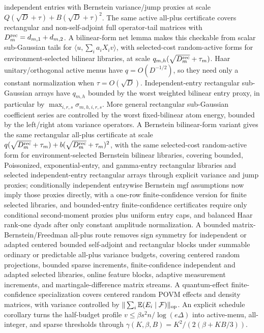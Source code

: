 \documentclass[11pt]{article}
\begin{document}
independent entries with Bernstein variance/jump proxies at scale
\(Q(\sqrt D+\tau)+B(\sqrt D+\tau)^2\).  The same active all-plus
certificate covers rectangular and non-self-adjoint full operator-tail matrices
with \(D_m^{\rm rec}=d_{m,1}+d_{m,2}\).  A bilinear-form net lemma makes this
checkable from scalar sub-Gaussian tails for
\(\langle u,\sum_i a_iX_i v\rangle\), with selected-cost random-active forms
for environment-selected bilinear libraries, at scale
\(q_{m,h}(\sqrt{D_m^{\rm rec}}+\tau_m)\).  Haar unitary/orthogonal active menus
have \(q=O(D^{-1/2})\), so they need only a constant normalization when
\(\tau=O(\sqrt D)\).  Independent-entry rectangular
sub-Gaussian arrays have \(q_{m,h}\) bounded by the worst weighted bilinear
entry proxy, in particular by \(\max_{i,r,s}\sigma_{m,h,i,r,s}\).  More general
rectangular sub-Gaussian coefficient series are controlled by the worst
fixed-bilinear atom energy, bounded by the left/right atom variance operators.
A Bernstein bilinear-form variant gives the same rectangular all-plus
certificate at scale
\(q(\sqrt{D_m^{\rm rec}}+\tau_m)+b(\sqrt{D_m^{\rm rec}}+\tau_m)^2\), with the
same selected-cost random-active form for environment-selected Bernstein
bilinear libraries, covering bounded, Poissonized, exponential-entry, and
gamma-entry rectangular libraries and selected independent-entry rectangular
arrays through explicit variance and jump proxies; conditionally independent
entrywise Bernstein mgf assumptions now imply those proxies directly, with a
one-row finite-confidence version for finite selected libraries,
and bounded-entry finite-confidence certificates require only conditional
second-moment proxies plus uniform entry caps,
and balanced Haar rank-one dyads after only constant amplitude normalization.
A bounded matrix-Bernstein/Freedman all-plus route removes sign symmetry for
independent or adapted centered bounded self-adjoint and rectangular blocks
under summable ordinary or predictable all-plus variance budgets, covering
centered random projections, bounded sparse increments, finite-confidence
independent and adapted selected libraries, online feature blocks,
adaptive measurement increments, and martingale-difference matrix streams.
A quantum-effect finite-confidence specialization covers centered random POVM
effects and density matrices, with variance controlled by
\(\|\sum_i\mathbb E(E_i\mid\mathcal F)\|_{\rm op}\).
An explicit schedule corollary turns the half-budget profile
\(v\le\beta s^2n/\log(e\Delta)\) into active-menu, all-integer, and sparse
thresholds through
\(\gamma(K,\beta,B)=K^2/(2(\beta+KB/3))\).
\end{document}
